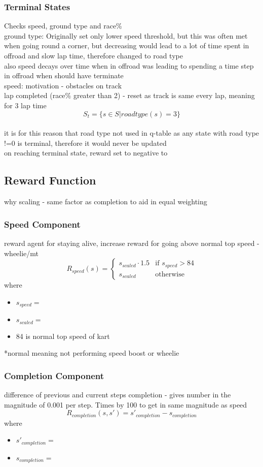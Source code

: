 \subsubsection{Terminal States}
Checks speed, ground type and race\%\\
ground type: Originally set only lower speed threshold, but this was often met when going round a corner, but decreasing would lead to a lot of time spent in offroad and slow lap time, therefore changed to road type\\ also speed decays over time when in offroad was leading to spending a time step in offroad when should have terminate
\\speed: motivation - obstacles on track
\\lap completed (race\% greater than 2) - reset as track is same every lap, meaning for 3 lap time 
\[ S_t = \{s \in S | roadtype(s) = 3 \}\]
\\ it is for this reason that road type not used in q-table as any state with road type !=0 is terminal, therefore it would never be updated\\
on reaching terminal state, reward set to negative to

\subsection{Reward Function}
why scaling - same factor as completion to aid in equal weighting
\subsubsection{Speed Component}
reward agent for staying alive, increase reward for going above normal top speed - wheelie/mt
\[
R_{speed}(s) = 
\begin{cases}
 s_{scaled} \cdot 1.5 & \text{if } s_{speed} > 84\\
 s_{scaled} & \text{otherwise}
\end{cases}
\]
where
\begin{itemize}
    \item $s_{speed}=$
    \item $s_{scaled}=$
    \item 84 is normal top speed of kart
\end{itemize}
*normal meaning not performing speed boost or wheelie
\subsubsection{Completion Component}
difference of previous and current steps completion - gives number in the magnitude of 0.001 per step. Times by 100 to get in same magnitude as speed
\[
R_{completion}(s, s') = s'_{completion} - s_{completion}
\]
where
\begin{itemize}
    \item $s'_{completion}=$
    \item $s_{completion}=$
\end{itemize}
